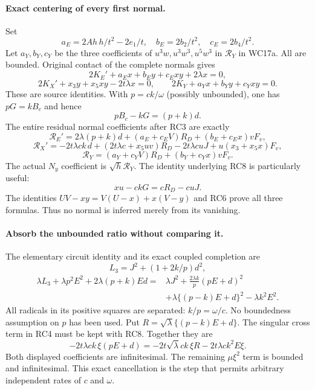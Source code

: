 \paragraph{Exact centering of every first normal.}
Set
\[
 a_E=2Ah\,h/t^2-2e_1/t,\quad b_E=2b_2/t^2,
 \quad c_E=2b_4/t^2.
\]
Let $a_Y,b_Y,c_Y$ be the three coefficients of
$u^3w,u^3w^3,u^5w^3$ in $\mathcal R_Y$ in WC17a.
All are bounded. Original contact of the complete normals gives
\[
 2K_E'+a_Ex+b_Ey+c_Exy+2\lambda x=0,
\]
\[
 2K_X'+x_3y+x_5xy-2t\lambda x=0,
 \qquad 2K_Y+a_Yx+b_Yy+c_Yxy=0.
 \tag{RC6}
\]
These are source identities. With $p=ck/\omega$ (possibly
unbounded), one has $pG=kB_c$ and hence
\[
 pB_c-kG=(p+k)d.
\]
The entire residual normal coefficients after RC3 are exactly
\[
 \mathcal R_E'=2\lambda(p+k)d
 +(a_E+c_EV)R_D+(b_E+c_Ex)vF_v,
 \tag{RC7}
\]
\[
 \mathcal R_X'=-2t\lambda ck\,d
 +(2t\lambda c+x_5uv)R_D-2t\lambda cuJ
                    +u(x_3+x_5x)F_v,
 \tag{RC8}
\]
\[
 \mathcal R_Y=(a_Y+c_YV)R_D+(b_Y+c_Yx)vF_v.
 \tag{RC9}
\]
The actual $N_y$ coefficient is $\sqrt h\mathcal R_Y$.
The identity underlying RC8 is particularly useful:
\[
                  xu-ckG=cR_D-cuJ.
\]
The identities $UV-xy=V(U-x)+x(V-y)$ and RC6 prove all three
formulas. Thus no normal is inferred merely from its vanishing.

\paragraph{Absorb the unbounded ratio without comparing it.}
The elementary circuit identity and its exact coupled completion are
\[
 L_3=J^2+(1+2k/p)d^2,
\]
\[
 \begin{split}
 \lambda L_3+\lambda p^2E^2+2\lambda(p+k)Ed
 ={}&\lambda J^2+\frac{2\lambda k}{p}(pE+d)^2\\
 &+\lambda\{(p-k)E+d\}^2-\lambda k^2E^2.
 \end{split}                                                    \tag{RC10}
\]
All radicals in its positive squares are separated: $k/p=\omega/c$.
No boundedness assumption on $p$ has been used. Put
$R=\sqrt\lambda\{(p-k)E+d\}$.
The singular cross term in RC4 must be kept with RC8. Together they
are
\[
 -2t\lambda ck\,\xi(pE+d)
 =-2t\sqrt\lambda ck\,\xi R-2t\lambda ck^2E\xi.
 \tag{RC11}
\]
Both displayed coefficients are infinitesimal. The remaining
$\mu\xi^2$ term is bounded and infinitesimal. This exact cancellation
is the step that permits arbitrary independent rates of $c$ and
$\omega$.

